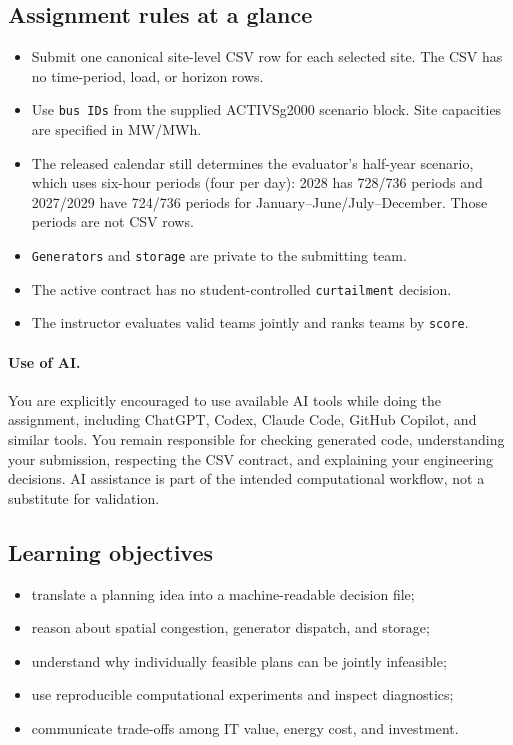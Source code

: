 \documentclass[12pt]{article}
\newcommand{\code}[1]{\texttt{#1}}
\begin{document}
\subsection{Assignment rules at a glance}
\begin{itemize}[leftmargin=*]
  \item Submit one canonical site-level CSV row for each selected site. The CSV has no
  time-period, load, or horizon rows.
  \item Use \code{bus IDs} from the supplied ACTIVSg2000 scenario block. Site
  capacities are specified in MW/MWh.
  \item The released calendar still determines the evaluator's half-year
  scenario, which uses six-hour periods (four per day): 2028 has 728/736 periods
  and 2027/2029 have 724/736 periods for January--June/July--December. Those
  periods are not CSV rows.
  \item \code{Generators} and \code{storage} are private to the submitting team.
  \item The active contract has no student-controlled \code{curtailment} decision.
  \item The instructor evaluates valid teams jointly and ranks teams by \code{score}.
\end{itemize}

\paragraph{Use of AI.} You are explicitly encouraged to use available AI tools while doing the
assignment, including ChatGPT, Codex, Claude Code, GitHub Copilot, and similar
tools. You remain responsible for checking generated code, understanding your
submission, respecting the CSV contract, and explaining your engineering
decisions. AI assistance is part of the intended computational workflow, not a
substitute for validation.

\subsection{Learning objectives}
\begin{itemize}[leftmargin=*]
  \item translate a planning idea into a machine-readable decision file;
  \item reason about spatial congestion, generator dispatch, and storage;
  \item understand why individually feasible plans can be jointly infeasible;
  \item use reproducible computational experiments and inspect diagnostics;
  \item communicate trade-offs among IT value, energy cost, and investment.
\end{itemize}
\end{document}
